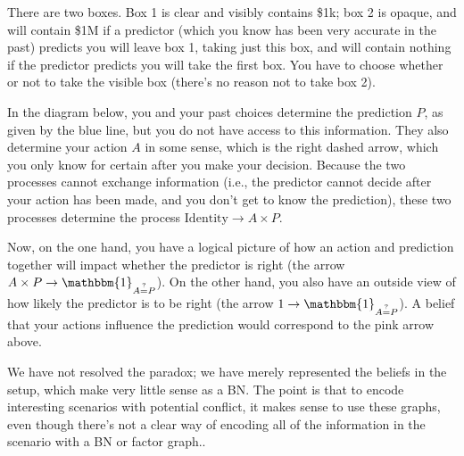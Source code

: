 \documentclass{article}
\begin{document}
	\begin{example}[Newcomb]
		There are two boxes. Box 1 is clear and visibly contains \$1k; box 2 is opaque, and will contain \$1M if a predictor (which you know has been very accurate in the past) predicts you will leave box 1, taking just this box, and will contain nothing if the predictor predicts you will take the first box. You have to choose whether or not to take the visible box (there's no reason not to take box 2).
		
		In the diagram below, you and your past choices determine the prediction $P$, as given by the blue line, but you do not have access to this information. They also determine your action $A$ in some sense, which is the right dashed arrow, which you only know for certain after you make your decision. Because the two processes cannot exchange information (i.e., the predictor cannot decide after your action has been made, and you don't get to know the prediction), these two processes determine the process $\mathrm{Identity} \to A \times P$.
		\begin{center}
		\end{center}
		Now, on the one hand, you have a logical picture of how an action and prediction together will impact whether the predictor is right (the arrow $A \times P \to \mathbbm{1}_{A \stackrel{?}{=} P}$). On the other hand, you also have an outside view of how likely the predictor is to be right (the arrow $1 \to \mathbbm{1}_{A \stackrel{?}{=} P}$). A belief that your actions influence the prediction would correspond to the pink arrow above.
		
		We have not resolved the paradox; we have merely represented the beliefs in the setup, which make very little sense as a BN. The point is that to encode interesting scenarios with potential conflict, it makes sense to use these graphs, even though there's not a clear way of encoding all of the information in the scenario with a BN or factor graph..
	\end{example}
	
\end{document}
